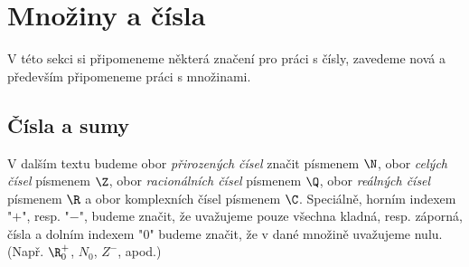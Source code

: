 \section{Množiny a čísla}\label{sec:mnoziny_a_cisla}

V této sekci si připomeneme některá značení pro práci s čísly, zavedeme nová a především připomeneme práci s množinami.

\subsection{Čísla a sumy}

\begin{convention}
    V dalším textu budeme obor \emph{přirozených čísel} značit písmenem $\N$, obor \emph{celých čísel} písmenem $\Z$, obor \emph{racionálních čísel} písmenem $\Q$, obor \emph{reálných čísel} písmenem $\R$ a obor komplexních čísel písmenem $\C$. Speciálně, horním indexem "$+$", resp. "$-$", budeme značit, že uvažujeme pouze všechna kladná, resp. záporná, čísla a dolním indexem "$0$" budeme značit, že v dané množině uvažujeme nulu. (Např. $\R_0^+$, $N_0$, $Z^-$, apod.) 
\end{convention}

